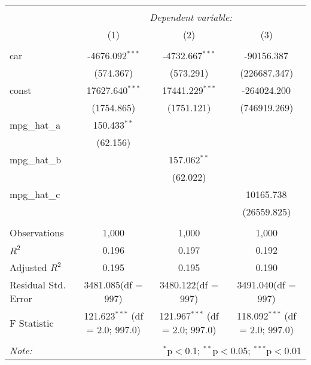 \begin{table}[!htbp] \centering
\begin{tabular}{@{\extracolsep{5pt}}lccc}
\\[-1.8ex]\hline
\hline \\[-1.8ex]
& \multicolumn{3}{c}{\textit{Dependent variable:}} \
\cr \cline{3-4}
\\[-1.8ex] & (1) & (2) & (3) \\
\hline \\[-1.8ex]
 car & -4676.092$^{***}$ & -4732.667$^{***}$ & -90156.387$^{}$ \\
  & (574.367) & (573.291) & (226687.347) \\
 const & 17627.640$^{***}$ & 17441.229$^{***}$ & -264024.200$^{}$ \\
  & (1754.865) & (1751.121) & (746919.269) \\
 mpg_hat_a & 150.433$^{**}$ & & \\
  & (62.156) & & \\
 mpg_hat_b & & 157.062$^{**}$ & \\
  & & (62.022) & \\
 mpg_hat_c & & & 10165.738$^{}$ \\
  & & & (26559.825) \\
\hline \\[-1.8ex]
 Observations & 1,000 & 1,000 & 1,000 \\
 $R^2$ & 0.196 & 0.197 & 0.192 \\
 Adjusted $R^2$ & 0.195 & 0.195 & 0.190 \\
 Residual Std. Error & 3481.085(df = 997) & 3480.122(df = 997) & 3491.040(df = 997)  \\
 F Statistic & 121.623$^{***}$ (df = 2.0; 997.0) & 121.967$^{***}$ (df = 2.0; 997.0) & 118.092$^{***}$ (df = 2.0; 997.0) \\
\hline
\hline \\[-1.8ex]
\textit{Note:} & \multicolumn{3}{r}{$^{*}$p$<$0.1; $^{**}$p$<$0.05; $^{***}$p$<$0.01} \\
\end{tabular}
\end{table}
